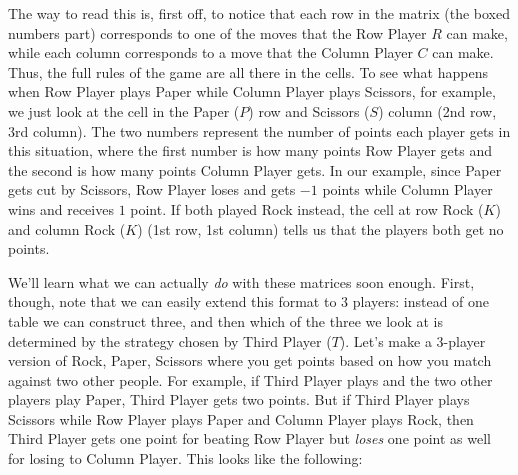 The way to read this is, first off, to notice that each row in the matrix (the boxed numbers part) corresponds to one of the moves that the Row Player $R$ can make, while each column corresponds to a move that the Column Player $C$ can make. Thus, the full rules of the game are all there in the cells. To see what happens when Row Player plays Paper while Column Player plays Scissors, for example, we just look at the cell in the Paper ($P$) row and Scissors ($S$) column (2nd row, 3rd column). The two numbers represent the number of points each player gets in this situation, where the first number is how many points Row Player gets and the second is how many points Column Player gets. In our example, since Paper gets cut by Scissors, Row Player loses and gets $-1$ points while Column Player wins and receives $1$ point. If both played Rock instead, the cell at row Rock ($K$) and column Rock ($K$) (1st row, 1st column) tells us that the players both get no points.

We'll learn what we can actually \textit{do} with these matrices soon enough. First, though, note that we can easily extend this format to 3 players: instead of one table we can construct three, and then which of the three we look at is determined by the strategy chosen by Third Player ($T$). Let's make a 3-player version of Rock, Paper, Scissors where you get points based on how you match against two other people. For example, if Third Player plays  and the two other players play \textsf{Paper}, Third Player gets two points. But if Third Player plays \textsf{Scissors} while Row Player plays \textsf{Paper} and Column Player plays \textsf{Rock}, then Third Player gets one point for beating Row Player but \textit{loses} one point as well for losing to Column Player. This looks like the following:

